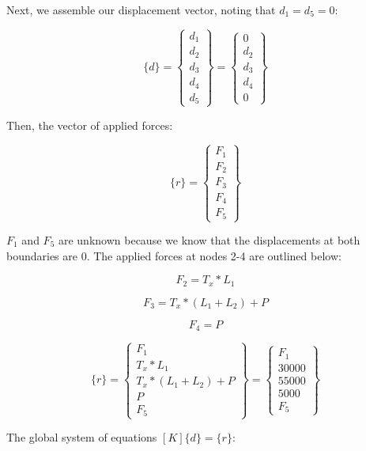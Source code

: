 \documentclass[../main.tex]{subfiles}
\begin{document}
Next, we assemble our displacement vector, noting that \(d_1 = d_5 = 0\):

\[
    \{d\} = 
    \begin{Bmatrix}
        d_1 \\ d_2 \\ d_3 \\d_4 \\d_5
    \end{Bmatrix}
    =
    \begin{Bmatrix}
        0 \\ d_2 \\ d_3 \\d_4 \\ 0
    \end{Bmatrix}
\]

Then, the vector of applied forces:

\[
    \{r\} = 
    \begin{Bmatrix}
        F_1 \\ F_2 \\ F_3 \\ F_4 \\ F_5
    \end{Bmatrix}
\]

\(F_1\) and \(F_5\) are unknown because we know that the displacements at both boundaries are 0.
The applied forces at nodes 2-4 are outlined below:

\[  
    F_2 = T_x * L_1  
\]

\[
    F_3 = T_x * (L_1 + L_2) + P
\]

\[
    F_4 = P
\]

\[
    \{r\} = 
    \begin{Bmatrix}
        F_1 \\ T_x * L_1 \\ T_x * (L_1 + L_2) + P \\ P \\ F_5
    \end{Bmatrix}
    =
    \begin{Bmatrix}
        F_1 \\ 30000 \\ 55000 \\ 5000 \\ F_5
    \end{Bmatrix}
\]

The global system of equations \([K]\{d\} = \{r\}\):
\end{document}
